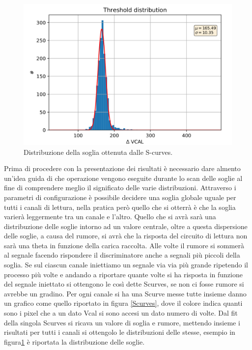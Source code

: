 \begin{figure}
\centering
\includegraphics[width=\textwidth]{Immagini/Threshold}
\caption{Distribuzione della soglia ottenuta dalle S-curves.}
\label{Threshold}
\end{figure}
Prima di procedere con la presentazione dei risultati è necessario dare almento un'idea guida di che operazione vengono eseguite durante lo scan delle soglie al fine di comprendere meglio il significato delle varie distribuzioni.
Attraverso i parametri di configurazione è possibile decidere una soglia globale uguale per tutti i canali di lettura, nella pratica però quello che si otterrà è che la soglia varierà leggermente tra un canale e l'altro. 
Quello che si avrà sarà una distribuzione delle soglie intorno ad un valore centrale, oltre a questa dispersione delle soglie, a causa del rumore, si avrà che la risposta del circuito di lettura non sarà una theta in funzione della carica raccolta. 
Alle volte il rumore si sommerà al segnale facendo rispondere il discriminatore anche a segnali più piccoli della soglia. Se sul ciascun canale iniettiamo un segnale via via più grande ripetendo il processo più volte e andando a riportare quante volte si ha risposta in funzione del segnale iniettato si ottengono le così dette Scurves, se non ci fosse rumore si avrebbe un gradino. 
Per ogni canale si ha una Scurve messe tutte insieme danno un grafico come quello riportato in figura \ref{Scurves}, dove il colore indica quanti sono i pixel che a un dato Vcal si sono accesi un dato numero di volte. Dal fit della singola Scurves si ricava un valore di soglia e rumore, mettendo insieme i risultati per tutti i canali si ottengolo le distribuzioni delle stesse, esempio in figura\ref{Threshold} è riportata la distribuzione delle soglie. 
